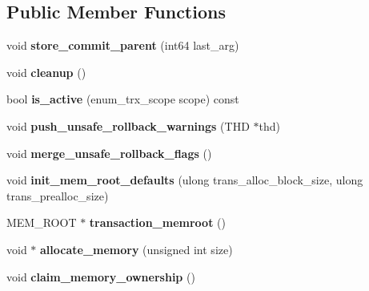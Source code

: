 \subsection*{Public Member Functions}
\begin{DoxyCompactItemize}
\item 
\mbox{\label{classTransaction__ctx_a731f6bd8c0a8a80de56c08de638bc28c}} 
void {\bfseries store\+\_\+commit\+\_\+parent} (int64 last\+\_\+arg)
\item 
\mbox{\label{classTransaction__ctx_ac6ebcd49772f10fc25f5d9b036760884}} 
void {\bfseries cleanup} ()
\item 
\mbox{\label{classTransaction__ctx_a1643a94dd4204c57fba4738336227512}} 
bool {\bfseries is\+\_\+active} (enum\+\_\+trx\+\_\+scope scope) const
\item 
\mbox{\label{classTransaction__ctx_a513a31570067b8765d18e1473577db09}} 
void {\bfseries push\+\_\+unsafe\+\_\+rollback\+\_\+warnings} (T\+HD $\ast$thd)
\item 
\mbox{\label{classTransaction__ctx_a0b01c0e7b58cc5a0aafeaf505ff6b178}} 
void {\bfseries merge\+\_\+unsafe\+\_\+rollback\+\_\+flags} ()
\item 
\mbox{\label{classTransaction__ctx_aeeb7f85ae13af58cbcdfd9bd6f8d0138}} 
void {\bfseries init\+\_\+mem\+\_\+root\+\_\+defaults} (ulong trans\+\_\+alloc\+\_\+block\+\_\+size, ulong trans\+\_\+prealloc\+\_\+size)
\item 
\mbox{\label{classTransaction__ctx_a5c3eb7dda13282efe5102305f3f576e9}} 
M\+E\+M\+\_\+\+R\+O\+OT $\ast$ {\bfseries transaction\+\_\+memroot} ()
\item 
\mbox{\label{classTransaction__ctx_a6f416ff6d916f00e34d8175185005de1}} 
void $\ast$ {\bfseries allocate\+\_\+memory} (unsigned int size)
\item 
\mbox{\label{classTransaction__ctx_a10981c2092436e73028ce3a597dbc5c7}} 
void {\bfseries claim\+\_\+memory\+\_\+ownership} ()
\item 

\end{DoxyCompactItemize}
